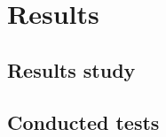 \chapter{Results}
\label{chap:results}

\section{Results study}
\label{sec:resstudy}

\section{Conducted tests}
\label{sec:tests}
